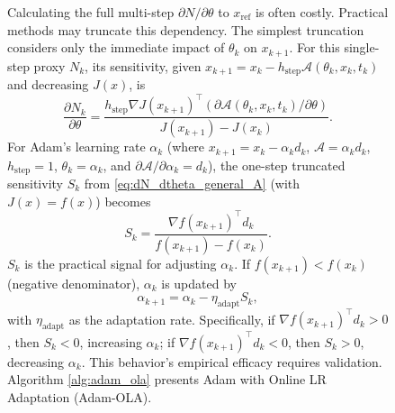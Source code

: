 \documentclass{article}
\begin{document}
\begin{figure}[H]
    \centering
    \begin{minipage}[t]{0.5\textwidth} %
        \vspace{0pt} %
         Calculating the full multi-step $\partial N / \partial \theta$ to $x_{\text{ref}}$ is often costly. Practical methods may truncate this dependency. The simplest truncation considers only the immediate impact of $\theta_k$ on $x_{k+1}$. For this single-step proxy $N_k$, its sensitivity, given $x_{k+1} = x_k - h_{\text{step}}\mathcal{A}(\theta_k, x_k, t_k)$ and decreasing $J(x)$, is
        \begin{equation}
            \frac{\partial N_k}{\partial \theta} = \frac{h_{\text{step}} \nabla J(x_{k+1})^\top (\partial \mathcal{A}(\theta_k, x_k, t_k) / \partial \theta)}{J(x_{k+1}) - J(x_k)}.
            \label{eq:dN_dtheta_general_A}
        \end{equation}
        For Adam's learning rate $\alpha_k$ (where $x_{k+1} = x_k - \alpha_k d_k$, $\mathcal{A} = \alpha_k d_k$, $h_{\text{step}}=1$, $\theta_k=\alpha_k$, and $\partial \mathcal{A} / \partial \alpha_k = d_k$), the one-step truncated sensitivity $S_k$ from \eqref{eq:dN_dtheta_general_A} (with $J(x)=f(x)$) becomes
        \begin{equation}
            S_k = \frac{\nabla f(x_{k+1})^\top d_k}{f(x_{k+1}) - f(x_k)}.
            \label{eq:Sk_definition_code_aligned}
        \end{equation}
        $S_k$ is the practical signal for adjusting $\alpha_k$. If $f(x_{k+1}) < f(x_k)$ (negative denominator), $\alpha_k$ is updated by
        \begin{equation}
            \alpha_{k+1} = \alpha_k - \eta_{\text{adapt}} S_k,
            \label{eq:alpha_update_code_aligned}
        \end{equation}
        with $\eta_{\text{adapt}}$ as the adaptation rate. Specifically, if $\nabla f(x_{k+1})^\top d_k > 0$, then $S_k < 0$, increasing $\alpha_k$; if $\nabla f(x_{k+1})^\top d_k < 0$, then $S_k > 0$, decreasing $\alpha_k$. This behavior's empirical efficacy requires validation. Algorithm \ref{alg:adam_ola} presents Adam with Online LR Adaptation (Adam-OLA).

\end{minipage}
\end{figure}
\end{document}
